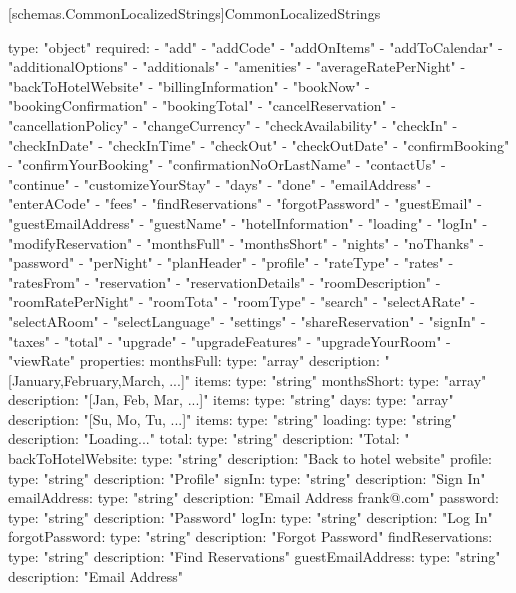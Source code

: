 [schemas.CommonLocalizedStrings]{CommonLocalizedStrings}
\begin{codeblock}
  type: "object"
  required:
  - "add"
  - "addCode"
  - "addOnItems"
  - "addToCalendar"
  - "additionalOptions"
  - "additionals"
  - "amenities"
  - "averageRatePerNight"
  - "backToHotelWebsite"
  - "billingInformation"
  - "bookNow"
  - "bookingConfirmation"
  - "bookingTotal"
  - "cancelReservation"
  - "cancellationPolicy"
  - "changeCurrency"
  - "checkAvailability"
  - "checkIn"
  - "checkInDate"
  - "checkInTime"
  - "checkOut"
  - "checkOutDate"
  - "confirmBooking"
  - "confirmYourBooking"
  - "confirmationNoOrLastName"
  - "contactUs"
  - "continue"
  - "customizeYourStay"
  - "days"
  - "done"
  - "emailAddress"
  - "enterACode"
  - "fees"
  - "findReservations"
  - "forgotPassword"
  - "guestEmail"
  - "guestEmailAddress"
  - "guestName"
  - "hotelInformation"
  - "loading"
  - "logIn"
  - "modifyReservation"
  - "monthsFull"
  - "monthsShort"
  - "nights"
  - "noThanks"
  - "password"
  - "perNight"
  - "planHeader"
  - "profile"
  - "rateType"
  - "rates"
  - "ratesFrom"
  - "reservation"
  - "reservationDetails"
  - "roomDescription"
  - "roomRatePerNight"
  - "roomTota"
  - "roomType"
  - "search"
  - "selectARate"
  - "selectARoom"
  - "selectLanguage"
  - "settings"
  - "shareReservation"
  - "signIn"
  - "taxes"
  - "total"
  - "upgrade"
  - "upgradeFeatures"
  - "upgradeYourRoom"
  - "viewRate"
  properties:
    monthsFull:
      type: "array"
      description: "[January,February,March, ...]"
      items:
        type: "string"
    monthsShort:
      type: "array"
      description: "[Jan, Feb, Mar, ...]"
      items:
        type: "string"
    days:
      type: "array"
      description: "[Su, Mo, Tu, ...]"
      items:
        type: "string"
    loading:
      type: "string"
      description: "Loading..."
    total:
      type: "string"
      description: "Total: "
    backToHotelWebsite:
      type: "string"
      description: "Back to hotel website"
    profile:
      type: "string"
      description: "Profile"
    signIn:
      type: "string"
      description: "Sign In"
    emailAddress:
      type: "string"
      description: "Email Address frank@\atsign@unknown.com"
    password:
      type: "string"
      description: "Password"
    logIn:
      type: "string"
      description: "Log In"
    forgotPassword:
      type: "string"
      description: "Forgot Password"
    findReservations:
      type: "string"
      description: "Find Reservations"
    guestEmailAddress:
      type: "string"
      description: "Email Address"

\end{codeblock}
